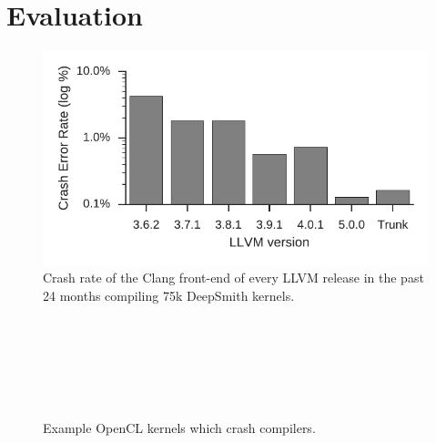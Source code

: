 \section{Evaluation}%
\label{sec:deepsmith-eval}

\begin{figure}
	\centering %
	\includegraphics[width=.85\columnwidth]{img/clang-crashes}%
	\caption[Crash rate of the Clang front-end]{%
		Crash rate of the Clang front-end of every LLVM release in the past 24
		months compiling 75k DeepSmith kernels.%
	}%
	\label{fig:clangs}
\end{figure}

\begin{table}
	\centering %
	\caption[Number of DeepSmith programs which trigger errors]{%
		The number of DeepSmith programs which trigger distinct Clang front-end
		assertions, and the number of programs which trigger unreachables.%
	}
	
	\label{tab:clangs}
\end{table}



\begin{figure}
  \centering %
  \\%
  \\%
  \\%
  \\%
  \\%
  \caption[Example OpenCL kernels which crash compilers]{%
    Example OpenCL kernels which crash compilers.%
  }%
\end{figure}

